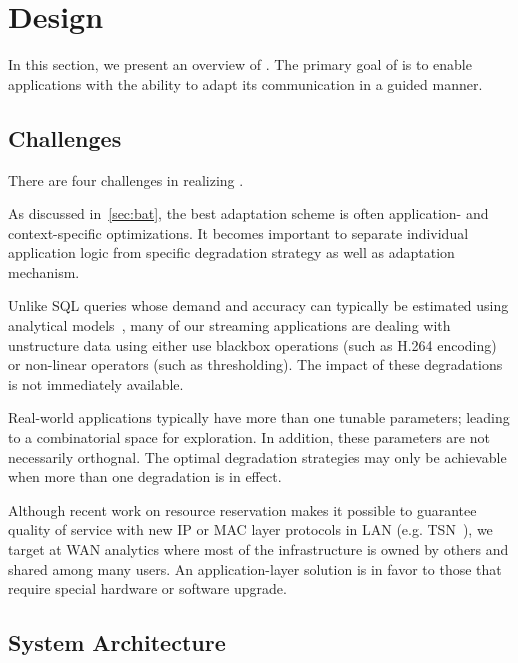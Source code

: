 \chapter{\sysname{} Design}
\label{sec:system-design}

In this section, we present an overview of \sysname{}. The primary goal of
\sysname{} is to enable applications with the ability to adapt its communication
in a guided manner.

\section{Challenges}
\label{sec:challenges}

\noindent There are four challenges in realizing \sysname{}.

 As discussed in~\autoref{sec:bat}, the
best adaptation scheme is often application- and context-specific
optimizations. It becomes important to separate individual application logic
from specific degradation strategy as well as adaptation mechanism.

 Unlike SQL queries whose demand and accuracy
can typically be estimated using analytical models~\cite{cormode2012synopses},
many of our streaming applications are dealing with unstructure data using
either use blackbox operations (such as H.264 encoding) or non-linear operators
(such as thresholding). The impact of these degradations is not immediately
available.

 Real-world applications typically have
more than one tunable parameters; leading to a combinatorial space for
exploration. In addition, these parameters are not necessarily orthognal.  The
optimal degradation strategies may only be achievable when more than one
degradation is in effect.

 Although recent work on
resource reservation makes it possible to guarantee quality of service with new
IP or MAC layer protocols in LAN (e.g. TSN~\cite{johas2013heterogeneous}), we
target at WAN analytics where most of the infrastructure is owned by others and
shared among many users. An application-layer solution is in favor to those that
require special hardware or software upgrade.

\section{System Architecture}
\label{sec:architecture}

